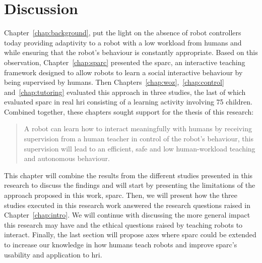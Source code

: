 \chapter{Discussion} \label{chap:discussion}
\glsresetall

Chapter~\ref{chap:background}, put the light on the absence of robot controllers today providing adaptivity to a robot with a low workload from humans and while ensuring that the robot's behaviour is constantly appropriate. Based on this observation, Chapter~\ref{chap:sparc} presented the \gls{sparc}, an interactive teaching framework designed to allow robots to learn a social interactive behaviour by being supervised by humans. Then Chapters~\ref{chap:woz},~\ref{chap:control} and~\ref{chap:tutoring} evaluated this approach in three studies, the last of which evaluated \gls{sparc} in real \gls{hri} consisting of a learning activity involving 75 children. Combined together, these chapters sought support for the thesis of this research:

\begin{quote}
	A robot can learn how to interact meaningfully with humans by receiving supervision from a human teacher in control of the robot's behaviour, this supervision will lead to an efficient, safe and low human-workload teaching and autonomous behaviour.	
\end{quote}

This chapter will combine the results from the different studies presented in this research to discuss the findings and will start by presenting the limitations of the approach proposed in this work, \gls{sparc}. Then, we will present how the three studies executed in this research work answered the research questions raised in Chapter~\ref{chap:intro}. We will continue with discussing the more general impact this research may have and the ethical questions raised by teaching robots to interact.
Finally, the last section will propose axes where \gls{sparc} could be extended to increase our knowledge in how humans teach robots and improve \gls{sparc}'s usability and application to \gls{hri}.


